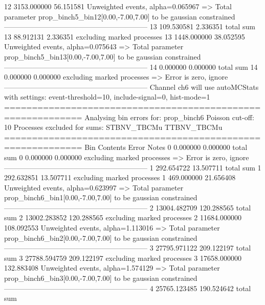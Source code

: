 12         3153.000000     56.151581       Unweighted events, alpha=0.065967
  => Total parameter prop_binch5_bin12[0.00,-7.00,7.00] to be gaussian constrained
------------------------------------------------------------
13         109.530581      2.336351        total sum                     
13         88.912131       2.336351        excluding marked processes    
13         1448.000000     38.052595       Unweighted events, alpha=0.075643
  => Total parameter prop_binch5_bin13[0.00,-7.00,7.00] to be gaussian constrained
------------------------------------------------------------
14         0.000000        0.000000        total sum                     
14         0.000000        0.000000        excluding marked processes    
  => Error is zero, ignore      
------------------------------------------------------------
Channel ch6 will use autoMCStats with settings: event-threshold=10, include-signal=0, hist-mode=1
============================================================
Analysing bin errors for: prop_binch6
Poisson cut-off: 10
Processes excluded for sums: STBNV_TBCMu TTBNV_TBCMu
============================================================
Bin        Contents        Error           Notes                         
0          0.000000        0.000000        total sum                     
0          0.000000        0.000000        excluding marked processes    
  => Error is zero, ignore      
------------------------------------------------------------
1          292.654722      13.507711       total sum                     
1          292.632851      13.507711       excluding marked processes    
1          469.000000      21.656408       Unweighted events, alpha=0.623997
  => Total parameter prop_binch6_bin1[0.00,-7.00,7.00] to be gaussian constrained
------------------------------------------------------------
2          13004.482709    120.288565      total sum                     
2          13002.283852    120.288565      excluding marked processes    
2          11684.000000    108.092553      Unweighted events, alpha=1.113016
  => Total parameter prop_binch6_bin2[0.00,-7.00,7.00] to be gaussian constrained
------------------------------------------------------------
3          27795.971122    209.122197      total sum                     
3          27788.594759    209.122197      excluding marked processes    
3          17658.000000    132.883408      Unweighted events, alpha=1.574129
  => Total parameter prop_binch6_bin3[0.00,-7.00,7.00] to be gaussian constrained
------------------------------------------------------------
4          25765.123485    190.524642      total sum                     
